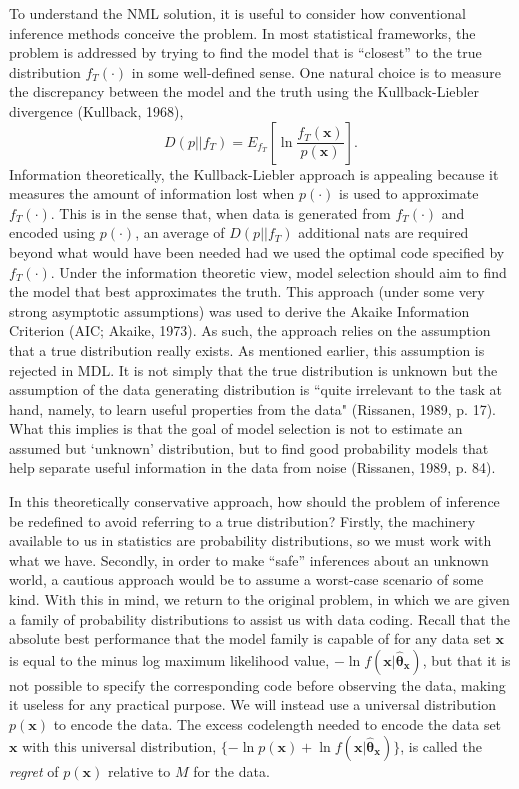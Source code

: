 \documentclass{elsart}
\begin{document}
To understand the NML solution, it is useful to consider how conventional inference methods
conceive the problem. In most statistical frameworks, the problem is addressed by trying to find
the model that is ``closest'' to the true distribution $f_T(\cdot)$ in some well-defined sense.
One natural choice is to measure the discrepancy between the model and the truth using the
Kullback-Liebler divergence (Kullback, 1968),
\begin{equation}\label{kl}
  D(p || f_T)= E_{f_T} \left[ \ln \frac{f_T(\bm x)}{p(\bm x)} \right].
\end{equation}
Information theoretically, the Kullback-Liebler approach is appealing because it measures the
amount of information lost when $p(\cdot)$ is used to approximate $f_T(\cdot)$. This is in the
sense that, when data is generated from $f_T(\cdot)$ and encoded using $p(\cdot)$, an average of
$D(p||f_T)$ additional nats are required beyond what would have been needed had we used the
optimal code specified by $f_T(\cdot)$. Under the information theoretic view, model selection
should aim to find the model that best approximates the truth. This approach (under some very
strong asymptotic assumptions) was used to derive the Akaike Information Criterion (AIC; Akaike,
1973). As such, the approach relies on the assumption that a true distribution really exists. As
mentioned earlier, this assumption is rejected in MDL. It is not simply that the true distribution
is unknown but the assumption of the data generating distribution is ``quite irrelevant to the
task at hand, namely, to learn useful properties from the data" (Rissanen, 1989, p. 17). What this
implies is that the goal of model selection is not to estimate an assumed but `unknown'
distribution, but to find good probability models that help separate useful information in the
data from noise (Rissanen, 1989, p. 84).


In this theoretically conservative approach, how should the problem of inference be redefined to
avoid referring to a true distribution? Firstly, the machinery  available to us in statistics are
probability distributions, so we must work with what we have. Secondly, in order to make ``safe''
inferences about an unknown world, a cautious approach would be to assume a worst-case scenario of
some kind. With this in mind, we return to the original problem, in which we are given a family of
probability distributions to assist us with data coding. Recall that the absolute best performance
that the model family is capable of for any data set $\bm x$ is equal to the minus log maximum
likelihood value, $- \ln f(\bm x |\hat{\bm\theta}_{\bm x})$, but that it is not possible to
specify the corresponding code before observing the data, making it useless for any practical
purpose. We will instead use a universal distribution $p(\bm x)$ to encode the data. The excess
codelength needed to encode the data set $\bm x$ with this universal distribution, $\{ -\ln p(\bm
x) + \ln f(\bm x | \hat{\bm \theta}_{\bm x}) \}$, is called the {\it regret} of $p(\bm x)$
relative to $M$ for the data.
\end{document}
